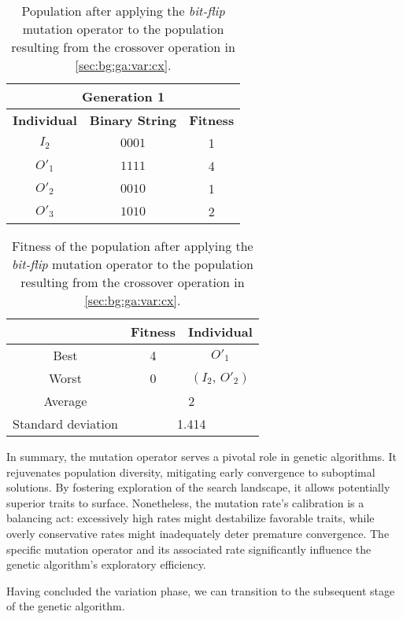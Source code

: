   
  \begin{table}[ht!]
    \centering
    \begin{tabular}{c | c | c }
      \multicolumn{3}{c}{\textbf{Generation 1}} \\
      \hline
      \hline
      \textbf{Individual} & \textbf{Binary String}  & \textbf{Fitness} \\
      \hline
      \(I_2\)             & \(0001\)                & 1 \\
      \(O'_1\)            & \(1111\)                & 4 \\
      \(O'_2\)            & \(0010\)                & 1 \\
      \(O'_3\)            & \(1010\)                & 2
    \end{tabular}
    \caption{
      Population after applying the \emph{bit-flip} mutation operator to the 
      population resulting from the crossover operation in 
      \vref{sec:bg:ga:var:cx}.
    }
    \label{tab:bg:ga:var:mut:2}
  \end{table}

  \begin{table}[H]
    \centering
    \begin{tabular}{|c|c|c|}
      \hline
            & \textbf{Fitness} & \textbf{Individual}  \\
      \hline
      Best  & 4 & \(O'_1\) \\
      Worst & 0 & \((I_2,\, O'_2)\) \\
      \hline
      \hline
      Average & \multicolumn{2}{c|}{2} \\
      \hline
      Standard deviation & \multicolumn{2}{c|}{1.414} \\
      \hline
    \end{tabular}
    \caption{
      Fitness of the population after applying the \emph{bit-flip} mutation 
      operator to the population resulting from the crossover operation in
      \vref{sec:bg:ga:var:cx}.
    }
    \label{tab:bg:ga:var:mut:fitness}
  \end{table}

  In summary, the mutation operator serves a pivotal role in genetic 
  algorithms.
  It rejuvenates population diversity, mitigating early convergence to 
  suboptimal solutions.
  By fostering exploration of the search landscape, it allows potentially 
  superior traits to surface.
  Nonetheless, the mutation rate's calibration is a balancing act: excessively 
  high rates might destabilize favorable traits, while overly conservative 
  rates might inadequately deter premature convergence.
  The specific mutation operator and its associated rate significantly 
  influence the genetic algorithm's exploratory efficiency.

  Having concluded the variation phase, we can transition to the subsequent 
  stage of the genetic algorithm.
